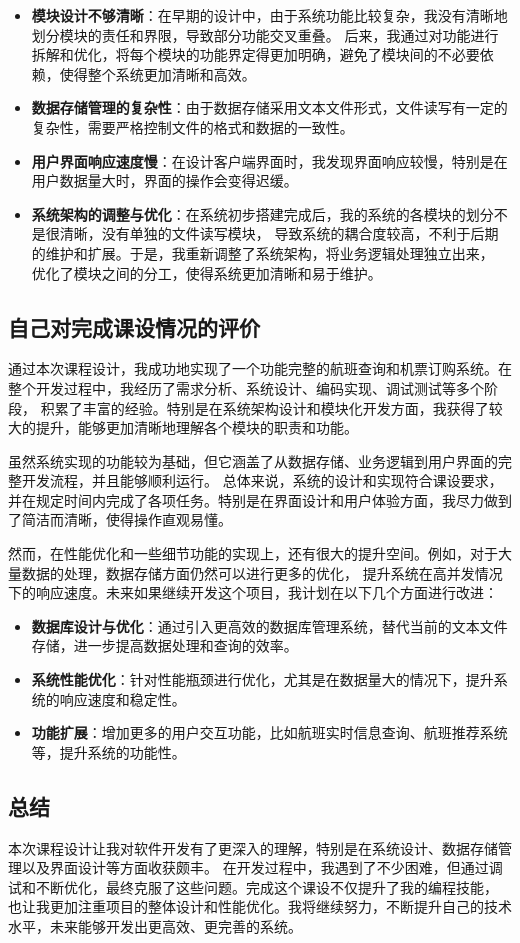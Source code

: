 \documentclass[UTF8, a4paper,12pt]{ctexart}
\begin{document}
\begin{itemize}
    \item \textbf{模块设计不够清晰}：在早期的设计中，由于系统功能比较复杂，我没有清晰地划分模块的责任和界限，导致部分功能交叉重叠。
    后来，我通过对功能进行拆解和优化，将每个模块的功能界定得更加明确，避免了模块间的不必要依赖，使得整个系统更加清晰和高效。

    \item \textbf{数据存储管理的复杂性}：由于数据存储采用文本文件形式，文件读写有一定的复杂性，需要严格控制文件的格式和数据的一致性。

    \item \textbf{用户界面响应速度慢}：在设计客户端界面时，我发现界面响应较慢，特别是在用户数据量大时，界面的操作会变得迟缓。

    \item \textbf{系统架构的调整与优化}：在系统初步搭建完成后，我的系统的各模块的划分不是很清晰，没有单独的文件读写模块，
    导致系统的耦合度较高，不利于后期的维护和扩展。于是，我重新调整了系统架构，将业务逻辑处理独立出来，
    优化了模块之间的分工，使得系统更加清晰和易于维护。
\end{itemize}

\subsection{自己对完成课设情况的评价}

通过本次课程设计，我成功地实现了一个功能完整的航班查询和机票订购系统。在整个开发过程中，我经历了需求分析、系统设计、编码实现、调试测试等多个阶段，
积累了丰富的经验。特别是在系统架构设计和模块化开发方面，我获得了较大的提升，能够更加清晰地理解各个模块的职责和功能。

虽然系统实现的功能较为基础，但它涵盖了从数据存储、业务逻辑到用户界面的完整开发流程，并且能够顺利运行。
总体来说，系统的设计和实现符合课设要求，并在规定时间内完成了各项任务。特别是在界面设计和用户体验方面，我尽力做到了简洁而清晰，使得操作直观易懂。

然而，在性能优化和一些细节功能的实现上，还有很大的提升空间。例如，对于大量数据的处理，数据存储方面仍然可以进行更多的优化，
提升系统在高并发情况下的响应速度。未来如果继续开发这个项目，我计划在以下几个方面进行改进：

\begin{itemize}
    \item \textbf{数据库设计与优化}：通过引入更高效的数据库管理系统，替代当前的文本文件存储，进一步提高数据处理和查询的效率。
    \item \textbf{系统性能优化}：针对性能瓶颈进行优化，尤其是在数据量大的情况下，提升系统的响应速度和稳定性。
    \item \textbf{功能扩展}：增加更多的用户交互功能，比如航班实时信息查询、航班推荐系统等，提升系统的功能性。
\end{itemize}

\subsection{总结}

本次课程设计让我对软件开发有了更深入的理解，特别是在系统设计、数据存储管理以及界面设计等方面收获颇丰。
在开发过程中，我遇到了不少困难，但通过调试和不断优化，最终克服了这些问题。完成这个课设不仅提升了我的编程技能，
也让我更加注重项目的整体设计和性能优化。我将继续努力，不断提升自己的技术水平，未来能够开发出更高效、更完善的系统。
\end{document}
